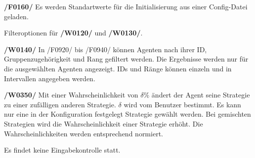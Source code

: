 \textbf{/F0160/} 
Es werden Standartwerte für die Initialisierung aus einer Config-Datei geladen.

Filteroptionen für \textbf{/W0120/} und \textbf{/W0130/}.

\textbf{/W0140/}
In /F0920/ bis /F0940/ können Agenten nach ihrer ID, Gruppenzugehörigkeit und Rang gefiltert werden. Die Ergebnisse werden nur für die ausgewählten Agenten angezeigt. IDs und Ränge können einzeln und in Intervallen angegeben werden.

\textbf{/W0350/}
Mit einer Wahrscheinlichkeit von $\delta\%$ ändert der Agent seine Strategie zu einer zufälligen anderen Strategie. $\delta$ wird vom Benutzer bestimmt. Es kann nur eine in der Konfiguration festgelegt Strategie gewählt werden. Bei gemischten Strategien wird die Wahrscheinlichkeit einer Strategie erhöht. Die Wahrscheinlichkeiten werden entsprechend normiert.

Es findet keine Eingabekontrolle statt.